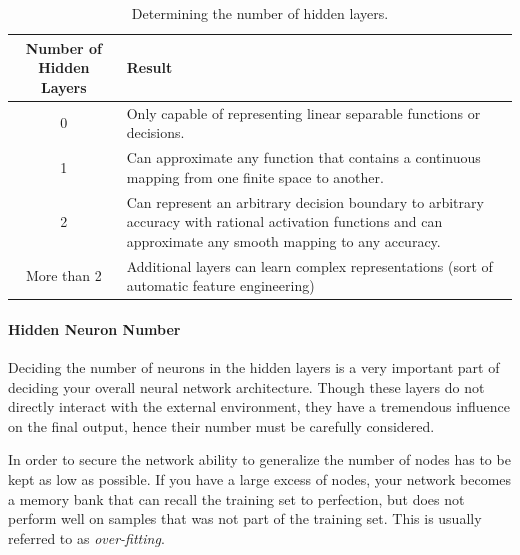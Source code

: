\begin{center}
	\begin{table}[htbp]
		\begin{tabularx}{\textwidth}{|c|X|}%
		\hline
		Number of Hidden Layers & Result\xdef\tempwidth{\the\linewidth}\\
		\hline
		0 & \multicolumn{1}{|m{\tempwidth}|}{Only capable of representing linear separable functions or decisions.} \\
		\hline
		1 & \multicolumn{1}{|m{\tempwidth}|}{Can approximate any function that contains a continuous mapping from one finite space to another.} \\
		\hline
		2 & \multicolumn{1}{|m{\tempwidth}|}{Can represent an arbitrary decision boundary to arbitrary accuracy with rational activation functions and can approximate any smooth mapping to any accuracy.} \\
		\hline
		More than 2 &  \multicolumn{1}{|m{\tempwidth}|}{Additional layers can learn complex representations (sort of automatic feature engineering)} \\
		\hline
	\end{tabularx}
	\vspace{2mm}
	\caption{Determining the number of hidden layers.}
	\label{tab:nn}
\end{table}
\end{center}

\paragraph{Hidden Neuron Number}

Deciding the number of neurons in the hidden layers is a very important part of deciding your overall neural network architecture. Though these layers do not directly interact with the external environment, they have a tremendous influence on the final output, hence their number must be carefully considered.

In order to secure the network ability to generalize the number of nodes has to be kept as low as possible. If you have a large excess of nodes, your network becomes a memory bank that can recall the training set to perfection, but does not perform well on samples that was not part of the training set. This is usually referred to as \emph{over-fitting}.

